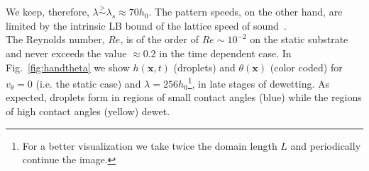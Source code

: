We keep, therefore, $\lambda \stackrel{>}{\sim} \lambda_s \approx 70 h_0$.
The pattern speeds, on the other hand, are limited by the intrinsic LB bound of the lattice speed of sound~\cite{succiLatticeBoltzmannEquation2001}.\\
The Reynolds number, $Re$, is of the order of $Re \sim 10^{-2}$ on the static substrate and never exceeds the value $\approx 0.2$ in the time dependent case.
In Fig.~\ref{fig:handtheta} we show $h(\mathbf{x},t)$ (droplets) and $\theta(\mathbf{x})$ (color coded) for $v_{\theta} = 0$ (i.e. the static case) and $\lambda = 256 h_0$\footnote{For a better visualization we take twice the domain length $L$ and periodically continue the image.}, in late stages of dewetting.
As expected, droplets form in regions of small contact angles (blue) while the regions of high contact angles (yellow) dewet.

